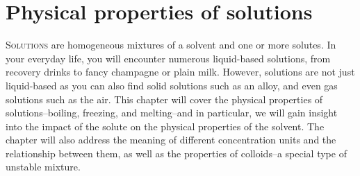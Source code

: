 \documentclass[main.tex]{subfiles}
\begin{document}
\linenumbers
  
\chapter[Physical properties of solutions]{Physical properties of solutions}


      \begin{marginfigure}
\end{marginfigure}


\lettrine[lines=4]{\color{black!45}S}{olutions} are homogeneous mixtures of a solvent and one or more solutes. In your everyday life, you will encounter numerous liquid-based solutions, from recovery drinks to fancy champagne or plain milk. However, solutions are not just liquid-based as you can also find solid solutions such as an alloy, and even gas solutions such as the air. This chapter will cover the physical properties of solutions--boiling, freezing, and melting--and in particular, we will gain insight into the impact of the solute on the physical properties of the solvent. The chapter will also address the meaning of different concentration units and the relationship between them, as well as the properties of colloids--a special type of unstable mixture.
 
\end{document}
